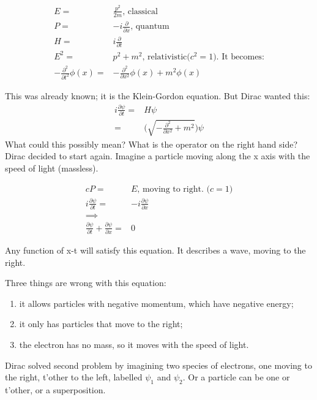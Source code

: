 \documentclass[]{article}
\begin{document}
\begin{align*}
	E =& \frac{p^2}{2m} \text {, classical}\\
	P =& -i \frac{\partial}{\partial x} \text{, quantum}\\
	H = & i \frac{\partial}{\partial t}\\
	E^2 =& p^2 + m^2 \text{, relativistic($c^2=1$). It becomes:}\\
	-\frac{\partial^2}{\partial t^2} \phi(x) =& -\frac{\partial^2}{\partial x^2}\phi(x) + m^2 \phi(x) 
\end{align*}

This was already known; it is the Klein-Gordon equation. But Dirac wanted this:
\begin{align*}
	i \frac{\partial \psi}{\partial t} =& H\psi\\
	=& \big(\sqrt{- \frac{\partial^2}{\partial x^2} + m^2}\big) \psi  
\end{align*}
What could this possibly mean? What is the operator on the right hand side? Dirac decided to start again. Imagine a particle moving along the x axis with the speed of light (massless).

\begin{align*}
	c P =& E \text{, moving to right. ($c=1$)}\\
	i \frac{\partial \psi}{\partial t} =& -i \frac{\partial \psi}{\partial x}\\
	\implies&\\
	\frac{\partial \psi}{\partial t} + \frac{\partial \psi}{\partial x}=&0
\end{align*}

Any function of x-t will satisfy this  equation. It describes a wave, moving to the right.

Three things are wrong with this equation:
\begin{enumerate}
	\item it allows particles with negative momentum, which have negative energy;\label{item:negative:energy}
	\item it only has particles that move to the right;\label{item:right:only}
	\item the electron has no mass, so it moves with the speed of light.\label{item:speed:light}
\end{enumerate}

Dirac solved second problem by imagining two species of electrons, one moving to the right, t'other to the left, labelled $\psi_1$ and $\psi_2$. Or a particle can be one or t'other, or a superposition.
\end{document}
